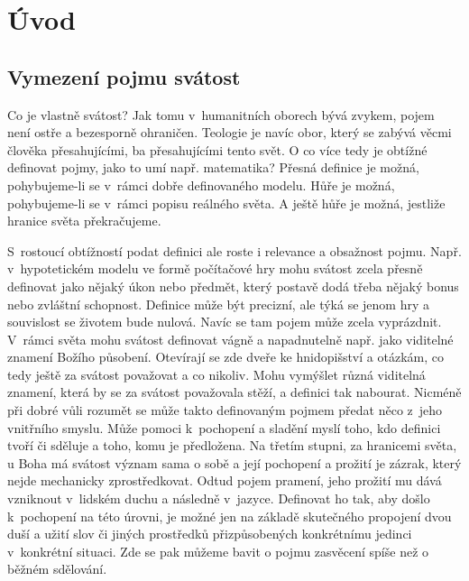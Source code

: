 \chapter{Úvod}
\label{kap:uvod}

\section{Vymezení pojmu svátost}
\label{div:vymezeni}

Co je vlastně svátost? Jak tomu v~humanitních oborech bývá zvykem, pojem není
ostře a bezesporně ohraničen. Teologie je navíc obor, který se zabývá věcmi
člověka přesahujícími, ba přesahujícími tento svět. O co více tedy je obtížné
definovat pojmy, jako to umí např. matematika? Přesná definice je možná,
pohybujeme-li se v~rámci dobře definovaného modelu. Hůře je možná, pohybu\-jeme-li
se v~rámci popisu reálného světa. A ještě hůře je možná, jestliže hranice světa
překračujeme.

S~rostoucí obtížností podat definici ale roste i relevance a obsažnost pojmu.
Např. v~hypotetickém modelu ve formě počítačové hry mohu svátost zcela přesně
definovat jako nějaký úkon nebo předmět, který postavě dodá třeba nějaký bonus
nebo zvláštní schopnost. Definice může být precizní, ale týká se jenom hry a
souvislost se životem bude nulová. Navíc se tam pojem může zcela vyprázdnit.
V~rámci světa mohu svátost definovat vágně a napadnutelně např. jako viditelné
znamení Božího působení. Otevírají se zde dveře ke hnidopišství a otázkám, co
tedy ještě za svátost považovat a co nikoliv. Mohu vymýšlet různá viditelná
znamení, která by se za svátost považovala stěží, a definici tak nabourat.
Nicméně při dobré vůli rozumět se může takto definovaným pojmem předat něco
z~jeho vnitřního smyslu. Může pomoci k~pochopení a sladění myslí toho, kdo
definici tvoří či sděluje a toho, komu je předložena. Na třetím stupni, za
hranicemi světa, u Boha má svátost význam sama o sobě a její pochopení a prožití
je zázrak, který nejde mechanicky zprostředkovat. Odtud pojem pramení, jeho
prožití mu dává vzniknout v~lidském duchu a následně v~jazyce. Definovat ho tak,
aby došlo k~pochopení na této úrovni, je možné jen na základě skutečného
propojení dvou duší a užití slov či jiných prostředků přizpůsobených konkrétnímu
jedinci v~konkrétní situaci. Zde se pak můžeme bavit o pojmu zasvěcení spíše než
o běžném sdělování.

